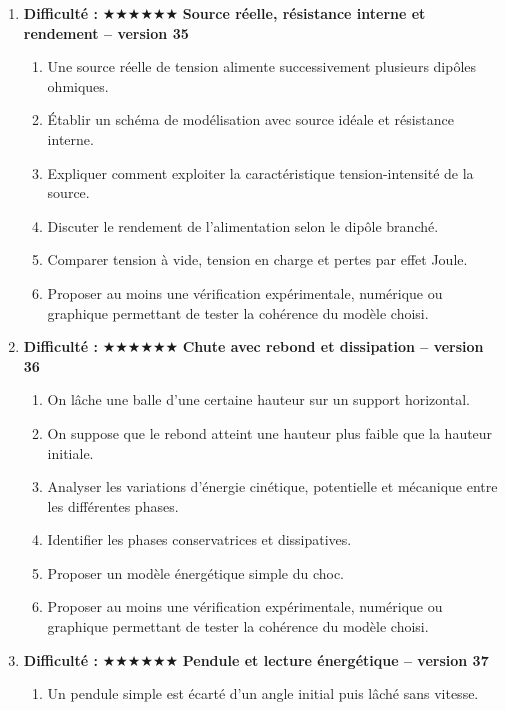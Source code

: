 \documentclass[11pt,a4paper]{article}
\newcommand{\etoiles}[1]{\textbf{Difficulté : }#1}
\begin{document}
\begin{enumerate}[label=\textbf{Problème long \arabic*.},leftmargin=*]
\begin{enumerate}[label=\alph*)]
\item Discuter ce qui changerait si l'on remplaçait un liquide par un gaz compressible.
\item Proposer au moins une vérification expérimentale, numérique ou graphique permettant de tester la cohérence du modèle choisi.
\end{enumerate}
\item \etoiles{★★★★★★}
\textbf{Source réelle, résistance interne et rendement -- version 35}
\begin{enumerate}[label=\alph*)]
\item Une source réelle de tension alimente successivement plusieurs dipôles ohmiques.
\item Établir un schéma de modélisation avec source idéale et résistance interne.
\item Expliquer comment exploiter la caractéristique tension-intensité de la source.
\item Discuter le rendement de l'alimentation selon le dipôle branché.
\item Comparer tension à vide, tension en charge et pertes par effet Joule.
\item Proposer au moins une vérification expérimentale, numérique ou graphique permettant de tester la cohérence du modèle choisi.
\end{enumerate}
\item \etoiles{★★★★★★}
\textbf{Chute avec rebond et dissipation -- version 36}
\begin{enumerate}[label=\alph*)]
\item On lâche une balle d'une certaine hauteur sur un support horizontal.
\item On suppose que le rebond atteint une hauteur plus faible que la hauteur initiale.
\item Analyser les variations d'énergie cinétique, potentielle et mécanique entre les différentes phases.
\item Identifier les phases conservatrices et dissipatives.
\item Proposer un modèle énergétique simple du choc.
\item Proposer au moins une vérification expérimentale, numérique ou graphique permettant de tester la cohérence du modèle choisi.
\end{enumerate}
\item \etoiles{★★★★★★}
\textbf{Pendule et lecture énergétique -- version 37}
\begin{enumerate}[label=\alph*)]
\item Un pendule simple est écarté d'un angle initial puis lâché sans vitesse.

\end{enumerate}
\end{enumerate}
\end{document}
